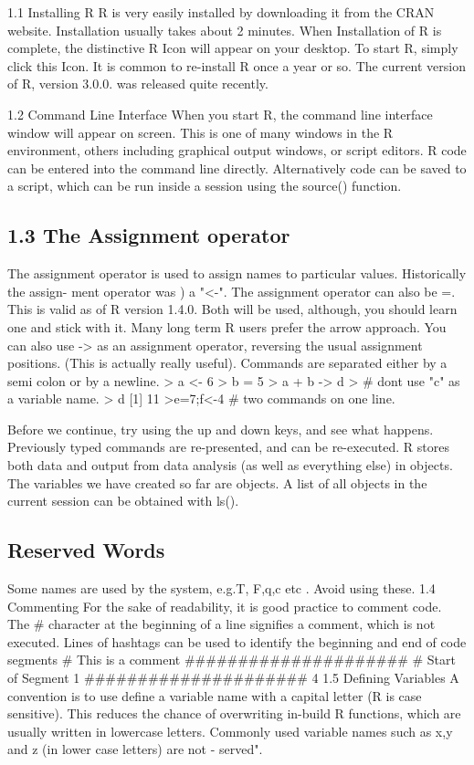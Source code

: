 1.1 Installing R
R is very easily installed by downloading it from the CRAN website. Installation usually takes
about 2 minutes. When Installation of R is complete, the distinctive R Icon will appear on your
desktop. To start R, simply click this Icon. It is common to re-install R once a year or so. The
current version of R, version 3.0.0. was released quite recently.

1.2 Command Line Interface
When you start R, the command line interface window will appear on screen. This is one
of many windows in the R environment, others including graphical output windows, or script
editors. R code can be entered into the command line directly. Alternatively code can be saved
to a script, which can be run inside a session using the source() function.

\subsection{1.3 The Assignment operator}
The assignment operator is used to assign names to particular values. Historically the assign-
ment operator was ) a "<-". The assignment operator can also be =. This is valid as of R
version 1.4.0.
Both will be used, although, you should learn one and stick with it. Many long term R
users prefer the arrow approach. You can also use -> as an assignment operator, reversing the
usual assignment positions. (This is actually really useful). Commands are separated either by
a semi colon or by a newline.
> a <- 6
> b = 5
> a + b -> d
> # dont use "c" as a variable name.
> d
[1] 11
>e=7;f<-4  # two commands on one line.

Before we continue, try using the up and down keys, and see what happens. Previously
typed commands are re-presented, and can be re-executed.
R stores both data and output from data analysis (as well as everything else) in objects.
The variables we have created so far are objects. A list of all objects in the current session can
be obtained with ls().
\subsection{Reserved Words}
Some names are used by the system, e.g.T, F,q,c etc . Avoid using these.
1.4 Commenting
For the sake of readability, it is good practice to comment code. The # character at the
beginning of a line signifies a comment, which is not executed. Lines of hashtags can be used
to identify the beginning and end of code segments
# This is a comment
#####################
# Start of Segment 1
#####################
4
1.5 Defining Variables
A convention is to use define a variable name with a capital letter (R is case sensitive). This
reduces the chance of overwriting in-build R functions, which are usually written in lowercase
letters. Commonly used variable names such as x,y and z (in lower case letters) are not \re-
served".
